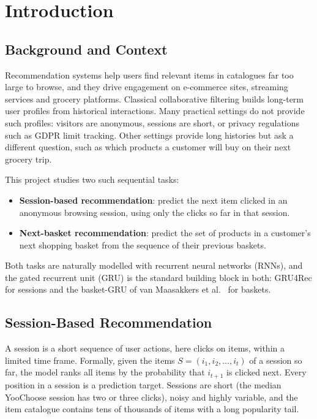 \chapter{Introduction}

\section{Background and Context}

Recommendation systems help users find relevant items in catalogues far too
large to browse, and they drive engagement on e-commerce sites, streaming
services and grocery platforms. Classical collaborative filtering builds
long-term user profiles from historical interactions. Many practical settings do
not provide such profiles: visitors are anonymous, sessions are short, or
privacy regulations such as GDPR limit tracking. Other settings provide long
histories but ask a different question, such as which products a customer will
buy on their next grocery trip.

This project studies two such sequential tasks:

\begin{itemize}
    \item \textbf{Session-based recommendation}: predict the next item clicked in
          an anonymous browsing session, using only the clicks so far in that
          session.
    \item \textbf{Next-basket recommendation}: predict the set of products in a
          customer's next shopping basket from the sequence of their previous
          baskets.
\end{itemize}

Both tasks are naturally modelled with recurrent neural networks (RNNs), and
the gated recurrent unit (GRU) is the standard building block in both: GRU4Rec
for sessions \cite{hidasi2016,hidasi2018} and the basket-GRU of van Maasakkers
et al.\ \cite{vanmaasakkers2023} for baskets.

\section{Session-Based Recommendation}

A session is a short sequence of user actions, here clicks on items, within a
limited time frame. Formally, given the items $S = (i_1, i_2, \ldots, i_t)$ of a
session so far, the model ranks all items by the probability that $i_{t+1}$ is
clicked next. Every position in a session is a prediction target. Sessions are
short (the median YooChoose session has two or three clicks), noisy and highly
variable, and the item catalogue contains tens of thousands of items with a long
popularity tail.

